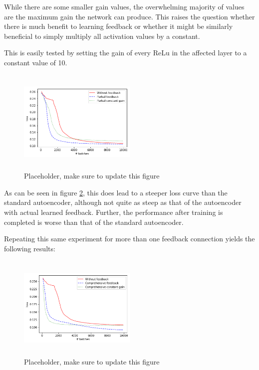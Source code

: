 \documentclass{article}
\begin{document}
  While there are some smaller gain values, the overwhelming majority of values are the maximum gain the network can produce. This raises the question whether there is much benefit to learning feedback or whether it might be similarly beneficial to simply multiply all activation values by a constant. 
  
  This is easily tested by setting the gain of every ReLu in the affected layer to a constant value of 10. 
  \begin{figure}[H]
      \centering
      \includegraphics[width=0.5\textwidth,height=5cm,keepaspectratio]{img/constgainpartial_loss.png}
      \caption{Placeholder, make sure to update this figure}
      \label{fig:contgainpartialloss}
  \end{figure}
  
  As can be seen in figure \ref{fig:contgainpartialloss}, this does lead to a steeper loss curve than the standard autoencoder, although not quite as steep as that of the autoencoder with actual learned feedback. Further, the performance after training is completed is worse than that of the standard autoencoder. 
  
  Repeating this same experiment for more than one feedback connection yields the following results: 
  
  \begin{figure}[H]
      \centering
      \includegraphics[width=0.5\textwidth,height=5cm,keepaspectratio]{img/constgainfull_loss.png}
      \caption{Placeholder, make sure to update this figure}
      \label{fig:contgainpartialloss}
  \end{figure}
  
\end{document}
